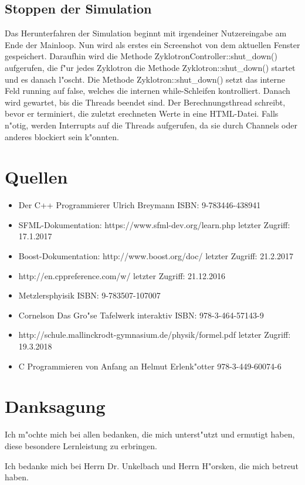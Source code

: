 \documentclass[14pt, a4paper]{report}
\begin{document}
\section{Stoppen der Simulation}
Das Herunterfahren der Simulation beginnt mit irgendeiner 
Nutzereingabe am Ende der Mainloop. Nun wird
als erstes ein Screenshot von dem aktuellen Fenster gespeichert. Daraufhin wird die Methode
ZyklotronController::shut\_down() aufgerufen, die f"ur jedes Zyklotron die Methode Zyklotron::shut\_down()
startet und es danach l"oscht. Die Methode Zyklotron::shut\_down() setzt das interne Feld running
auf false, welches die internen while-Schleifen kontrolliert. Danach wird gewartet, bis die Threads
beendet sind. Der Berechnungsthread schreibt, bevor er terminiert, die zuletzt erechneten Werte in
eine HTML-Datei. Falls n"otig, werden Interrupts auf die Threads aufgerufen, da sie durch Channels
oder anderes blockiert sein k"onnten.

\chapter{Quellen}
\begin{itemize}

\item Der C++ Programmierer Ulrich Breymann ISBN: 9-783446-438941
\item SFML-Dokumentation: https://www.sfml-dev.org/learn.php letzter Zugriff: 17.1.2017
\item Boost-Dokumentation: http://www.boost.org/doc/ letzter Zugriff: 21.2.2017
\item http://en.cppreference.com/w/ letzter Zugriff: 21.12.2016
\item Metzlersphyisik ISBN: 9-783507-107007
\item Cornelson Das Gro"se Tafelwerk interaktiv ISBN: 978-3-464-57143-9
\item http://schule.mallinckrodt-gymnasium.de/physik/formel.pdf letzter Zugriff: 19.3.2018
\item C Programmieren von Anfang an Helmut Erlenk"otter 978-3-449-60074-6
\end{itemize}

\chapter{Danksagung}
Ich m"ochte mich bei allen bedanken, die mich unterst"utzt und ermutigt haben, diese
besondere Lernleistung zu erbringen.

Ich bedanke mich bei Herrn Dr. Unkelbach und Herrn H"orsken, 
die mich betreut haben. 
\end{document}
